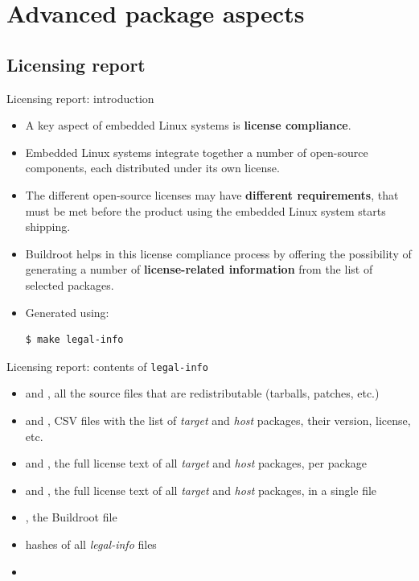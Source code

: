 
\section{Advanced package aspects}

\subsection{Licensing report}

\begin{frame}[fragile]{Licensing report: introduction}
  \begin{itemize}
  \item A key aspect of embedded Linux systems is {\bf license
      compliance}.
  \item Embedded Linux systems integrate together a number of
    open-source components, each distributed under its own license.
  \item The different open-source licenses may have {\bf different
      requirements}, that must be met before the product using the
    embedded Linux system starts shipping.
  \item Buildroot helps in this license compliance process by offering
    the possibility of generating a number of {\bf license-related
      information} from the list of selected packages.
  \item Generated using:
\begin{block}{}
\begin{verbatim}
$ make legal-info
\end{verbatim}
\end{block}
  \end{itemize}
\end{frame}

\begin{frame}{Licensing report: contents of {\tt legal-info}}
  \begin{itemize}
  \item {} and , all the source files
    that are redistributable (tarballs, patches, etc.)
  \item {} and , CSV files
    with the list of {\em target} and {\em host} packages, their
    version, license, etc.
  \item {} and , the full license text of all {\em
      target} and {\em host} packages, per package
  \item {} and , the full
    license text of all {\em target} and {\em host} packages, in a
    single file
  \item {}, the Buildroot  file
  \item {} hashes of all {\em legal-info} files
  \item {}
  \end{itemize}
\end{frame}

